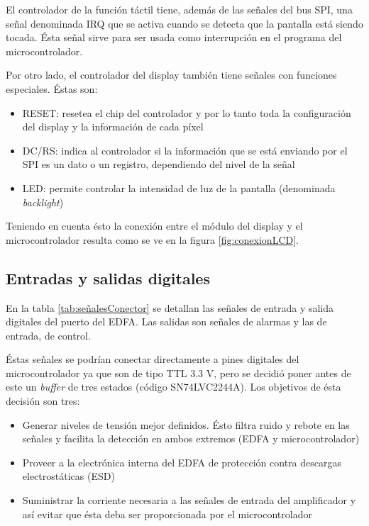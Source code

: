El controlador de la función táctil tiene, además de las señales del bus SPI, una señal denominada IRQ que se activa cuando se detecta que la pantalla está siendo tocada. Ésta señal sirve para ser usada como interrupción en el programa del microcontrolador.

Por otro lado, el controlador del display también tiene señales con funciones especiales. Éstas son:

\begin{itemize}
\item RESET: resetea el chip del controlador y por lo tanto toda la configuración del display y la información de cada píxel
\item DC/RS: indica al controlador si la información que se está enviando por el SPI es un dato o un registro, dependiendo del nivel de la señal
\item LED: permite controlar la intensidad de luz de la pantalla (denominada \textit{backlight})
\end{itemize}

Teniendo en cuenta ésto la conexión entre el módulo del display y el microcontrolador resulta como se ve en la figura \ref{fig:conexionLCD}.


\subsection{Entradas y salidas digitales}

En la tabla \ref{tab:señalesConector} se detallan las señales de entrada y salida digitales del puerto del EDFA. Las salidas son señales de alarmas y las de entrada, de control.

Éstas señales se podrían conectar directamente a pines digitales del microcontrolador ya que son de tipo TTL 3.3 V, pero se decidió poner antes de este un \textit{buffer} de tres estados (código SN74LVC2244A). Los objetivos de ésta decisión son tres:

\begin{itemize}
\item Generar niveles de tensión mejor definidos. Ésto filtra ruido y rebote en las señales y facilita la detección en ambos extremos (EDFA y microcontrolador)
\item Proveer a la electrónica interna del EDFA de protección contra descargas electrostáticas (ESD)
\item Suministrar la corriente necesaria a las señales de entrada del amplificador y así evitar que ésta deba ser proporcionada por el microcontrolador
\end{itemize}

